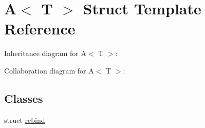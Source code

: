 \hypertarget{struct_a}{}\section{A$<$ T $>$ Struct Template Reference}
\label{struct_a}


Inheritance diagram for A$<$ T $>$\+:


Collaboration diagram for A$<$ T $>$\+:
\subsection*{Classes}
\begin{DoxyCompactItemize}
\item 
struct \mbox{\hyperlink{struct_a_1_1rebind}{rebind}}
\end{DoxyCompactItemize}
